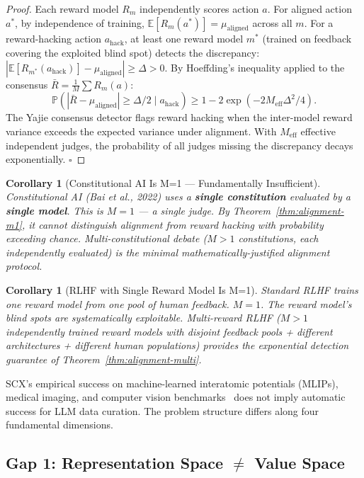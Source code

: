\documentclass[11pt,twocolumn]{article}
\newtheorem{corollary}[theorem]{Corollary}
\begin{document}
\begin{proof}
Each reward model $R_m$ independently scores action $a$. For aligned action $a^*$, by independence of training, $\mathbb{E}[R_m(a^*)] = \mu_{\text{aligned}}$ across all $m$. For a reward-hacking action $a_{\text{hack}}$, at least one reward model $m^*$ (trained on feedback covering the exploited blind spot) detects the discrepancy: $|\mathbb{E}[R_{m^*}(a_{\text{hack}})] - \mu_{\text{aligned}}| \geq \Delta > 0$. By Hoeffding's inequality applied to the consensus $\bar{R} = \frac{1}{M}\sum R_m(a)$:
\[
\mathbb{P}(|\bar{R} - \mu_{\text{aligned}}| \geq \Delta/2 \mid a_{\text{hack}}) \geq 1 - 2\exp(-2M_{\text{eff}}\Delta^2/4).
\]
The Yajie consensus detector flags reward hacking when the inter-model reward variance exceeds the expected variance under alignment. With $M_{\text{eff}}$ effective independent judges, the probability of all judges missing the discrepancy decays exponentially. $\square$
\end{proof}

\begin{corollary}[Constitutional AI Is M=1 — Fundamentally Insufficient]
Constitutional AI (Bai et al., 2022) uses a \textbf{single constitution} evaluated by a \textbf{single model}. This is $M=1$ — a single judge. By Theorem~\ref{thm:alignment-m1}, it cannot distinguish alignment from reward hacking with probability exceeding chance. Multi-constitutional debate ($M>1$ constitutions, each independently evaluated) is the minimal mathematically-justified alignment protocol.
\end{corollary}

\begin{corollary}[RLHF with Single Reward Model Is M=1]
Standard RLHF trains one reward model from one pool of human feedback. $M=1$. The reward model's blind spots are systematically exploitable. Multi-reward RLHF ($M>1$ independently trained reward models with disjoint feedback pools + different architectures + different human populations) provides the exponential detection guarantee of Theorem~\ref{thm:alignment-multi}.
\end{corollary}

SCX's empirical success on machine-learned interatomic potentials (MLIPs), medical imaging, and computer vision benchmarks~\cite{scx2026} does not imply automatic success for LLM data curation. The problem structure differs along four fundamental dimensions.

\subsection{Gap 1: Representation Space $\neq$ Value Space}
\end{document}

